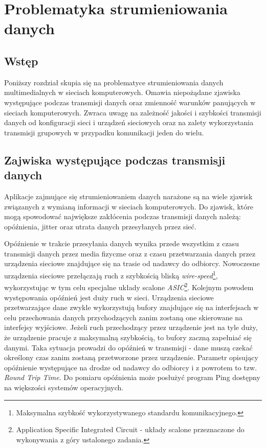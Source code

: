 \chapter{Problematyka strumieniowania danych}
\label{cha:rozdzial2}

\section{Wstęp}

Poniższy rozdział skupia się na problematyce strumieniowania danych multimedialnych w sieciach komputerowych. Omawia niepożądane zjawiska występujące podczas transmisji danych oraz zmienność warunków panujących w sieciach komputerowych. Zwraca uwagę na zależność jakości i szybkości transmisji danych od konfiguracji sieci i urządzeń sieciowych oraz na zalety wykorzystania transmisji grupowych w przypadku komunikacji jeden do wielu.

\section{Zajwiska występujące podczas transmisji danych}

Aplikacje zajmujące się strumieniowaniem danych narażone są na wiele zjawisk związanych z wymianą informacji w sieciach komputerowych. Do zjawisk, które mogą spowodować największe zakłócenia podczas transmisji danych należą: opóźnienia, jitter oraz utrata danych przesyłanych przez sieć.

Opóźnienie w trakcie przesyłania danych wynika przede wszystkim z czasu transmisji danych przez media fizyczne oraz z czasu przetwarzania danych przez urządzenia sieciowe znajdujące się na trasie od nadawcy do odbiorcy. Nowoczesne urządzenia sieciowe przełączają ruch z szybkością bliską \textit{wire-speed}\footnote{Maksymalna szybkość wykorzystywanego standardu komunikacyjnego.}, wykorzystując w tym celu specjalne układy scalone \textit{ASIC}\footnote{Application Specific Integrated Circuit - układy scalone przeznaczone do wykonywania z góry ustalonego zadania.}. Kolejnym powodem występowania opóźnień jest duży ruch w sieci. Urządzenia sieciowe przetwarzające dane zwykle wykorzystują bufory znajdujące się na interfejsach w celu przechowania danych przychodzących zanim zostaną one skierowane na interfejsy wyjściowe. Jeżeli ruch przechodzący przez urządzenie jest na tyle duży, że urządzenie pracuje z maksymalną szybkością, to bufory zaczną zapełniać się danymi. Taka sytuacja prowadzi do opóźnień w transmisji - dane muszą czekać określony czas zanim zostaną przetworzone przez urządzenie. Parametr opisujący opóźnienie występujące na drodze od nadawcy do odbiorcy i z powrotem to tzw. \textit{Round Trip Time}. Do pomiaru opóźnienia może posłużyć program Ping dostępny na większości systemów operacyjnych.

